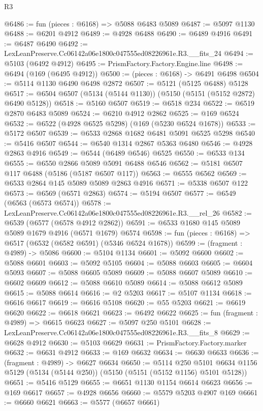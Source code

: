 \begin{lexlean}{R3}
\begin{coremodule}
@6486 := fun (pieces : @6168) => @5088 @6483 @5089
@6487 := @5097 @1130
@6488 := @6201 @4912
@6489 := @4928 @6488
@6490 := @6489 @4916
@6491 := @6487 @6490
@6492 := LexLeanPreserve.Cc06142a06e1800c047555ed08226961e.R3.__fits_24
@6494 := @5103 (@6492 @4912)
@6495 := PrismFactory.Factory.Engine.line
@6498 := @6494 (@169 (@6495 @4912))
@6500 := (pieces : @6168) -> @6491 @6498
@6504 := @5114 @1130 @6490 @6498 @2872
@6507 := @5121 (@5125 @6488) @5128
@6517 := @6504 @6507 (@5134 (@5144 @1130)) (@5150 (@5151 (@5152 @2872) @6490 @5128))
@6518 := @5160 @6507
@6519 := @6518 @234
@6522 := @6519 @2870 @6483 @5089
@6524 := @6210 @4912 @2862
@6525 := @169 @6524
@6532 := @6522 (@4928 @6525 @5298) (@169 (@5230 @6524 @1678))
@6533 := @5172 @6507
@6539 := @6533 @2868 @1682 @6481 @5091 @6525 @5298
@6540 := @5416 @6507
@6544 := @6540 @1314 @2867 @5363 @6480
@6546 := @4928 @2863 @4916
@6549 := @6544 (@6489 @6546) @6525
@6550 := @6533 @134
@6555 := @6550 @2866 @5089 @5091 @6488 @6546
@6562 := @5181 @6507 @117 @6488 (@5186 (@5187 @6507 @117))
@6563 := @6555 @6562
@6569 := @6533 @2864 @145 @5089 @5089 @2863 @4916
@6571 := @5338 @6507 @122
@6573 := @6569 (@6571 @2863)
@6574 := @5194 @6507
@6577 := @6549 (@6563 (@6573 @6574))
@6578 := LexLeanPreserve.Cc06142a06e1800c047555ed08226961e.R3.__rel_26
@6582 := @6539 (@6577 (@6578 @4912 @2862))
@6591 := @6533 @1680 @145 @5089 @5089 @1679 @4916 (@6571 @1679) @6574
@6598 := fun (pieces : @6168) => @6517 (@6532 (@6582 @6591) (@5346 @6524 @1678))
@6599 := (fragment : @4989) -> @5086
@6600 := @5104 @1134
@6601 := @5092 @6600
@6602 := @5088 @6601
@6603 := @5092 @5105
@6604 := @5088 @6603
@6605 := @6604 @5093
@6607 := @5088 @6605 @5089
@6609 := @5088 @6607 @5089
@6610 := @6602 @6609
@6612 := @5088 @6610 @5089
@6614 := @5088 @6612 @5089
@6615 := @5088 @6614
@6616 := @2 @5203
@6617 := @5107 @1134
@6618 := @6616 @6617
@6619 := @6616 @5108
@6620 := @55 @5203
@6621 := @6619 @6620
@6622 := @6618 @6621
@6623 := @6492 @6622
@6625 := fun (fragment : @4989) => @6615 @6623
@6627 := @5097 @250 @5101
@6628 := LexLeanPreserve.Cc06142a06e1800c047555ed08226961e.R3.__fits_8
@6629 := @6628 @4912
@6630 := @5103 @6629
@6631 := PrismFactory.Factory.marker
@6632 := @6631 @4912
@6633 := @169 @6632
@6634 := @6630 @6633
@6636 := (fragment : @4989) -> @6627 @6634
@6650 := @5114
    @250
    @5101
    @6634
    @1156
    @5129
    (@5134 (@5144 @250))
    (@5150 (@5151 (@5152 @1156) @5101 @5128))
@6651 := @5416 @5129
@6655 := @6651 @1130 @1154 @6614 @6623
@6656 := @169 @6617
@6657 := @4928 @6656
@6660 := @5579 @5203 @4907 @169
@6661 := @6660 @6621
@6663 := @5577 (@6657 @6661)

\end{coremodule}
\end{lexlean}
